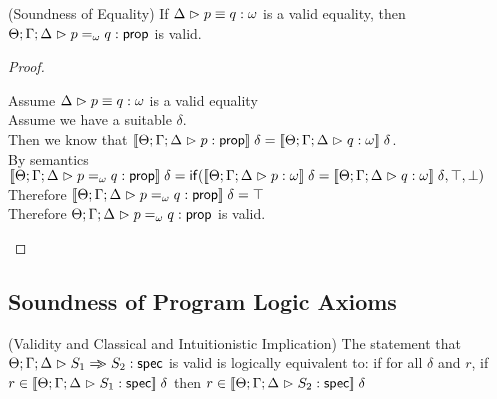 \begin{lemma}{(Soundness of Equality)}
  If $\judgeEqA{p}{q}{\omega}$ is a valid equality, then $\judgeA{p =_\omega q}{\assert}$ is valid.
\end{lemma}
\begin{proof}
\begin{tabbedproof}
\oo Assume $\judgeEqA{p}{q}{\omega}$ is a valid equality \\
\oo Assume we have a suitable $\delta$. \\ 
\ooo Then we know that $\interp{\judgeA{p}{\assert}}\;\delta = \interp{\judgeA{q}{\omega}}\;\delta$. \\
\ooo By semantics $\interp{\judgeA{p =_\omega q}{\assert}}\;\delta = \IfThenElse{\interp{\judgeA{p}{\omega}}\;\delta = \interp{\judgeA{q}{\omega}}\;\delta}{\top}{\bot}$ \\
\ooo Therefore $\interp{\judgeA{p =_\omega q}{\assert}}\;\delta = \top$ \\
\oo Therefore $\judgeA{p =_\omega q}{\assert}$ is valid.
\end{tabbedproof}
\end{proof}

\subsection{Soundness of Program Logic Axioms}

\begin{lemma}{(Validity and Classical and Intuitionistic Implication)}
The statement that $\judgeS{S_1 \specimp S_2}$ is valid is logically equivalent to: if
for all $\delta$ and $r$, if $r \in \interp{\judgeS{S_1}}\;\delta$ then $r \in \interp{\judgeS{S_2}}\;\delta$  
\end{lemma}

